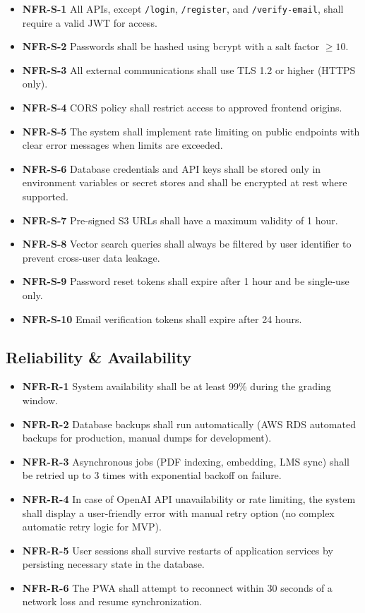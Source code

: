 \documentclass[12pt,a4paper]{article}
\begin{document}
\begin{itemize}
    \item \textbf{NFR-S-1} All APIs, except \texttt{/login}, \texttt{/register}, and \texttt{/verify-email}, shall require a valid JWT for access.
    \item \textbf{NFR-S-2} Passwords shall be hashed using bcrypt with a salt factor $\geq 10$.
    \item \textbf{NFR-S-3} All external communications shall use TLS 1.2 or higher (HTTPS only).
    \item \textbf{NFR-S-4} CORS policy shall restrict access to approved frontend origins.
    \item \textbf{NFR-S-5} The system shall implement rate limiting on public endpoints with clear error messages when limits are exceeded.
    \item \textbf{NFR-S-6} Database credentials and API keys shall be stored only in environment variables or secret stores and shall be encrypted at rest where supported.
    \item \textbf{NFR-S-7} Pre-signed S3 URLs shall have a maximum validity of 1 hour.
    \item \textbf{NFR-S-8} Vector search queries shall always be filtered by user identifier to prevent cross-user data leakage.
    \item \textbf{NFR-S-9} Password reset tokens shall expire after 1 hour and be single-use only.
    \item \textbf{NFR-S-10} Email verification tokens shall expire after 24 hours.
\end{itemize}

\subsection{Reliability \& Availability}

\begin{itemize}
    \item \textbf{NFR-R-1} System availability shall be at least 99\% during the grading window.
    \item \textbf{NFR-R-2} Database backups shall run automatically (AWS RDS automated backups for production, manual dumps for development).
    \item \textbf{NFR-R-3} Asynchronous jobs (PDF indexing, embedding, LMS sync) shall be retried up to 3 times with exponential backoff on failure.
    \item \textbf{NFR-R-4} In case of OpenAI API unavailability or rate limiting, the system shall display a user-friendly error with manual retry option (no complex automatic retry logic for MVP).
    \item \textbf{NFR-R-5} User sessions shall survive restarts of application services by persisting necessary state in the database.
    \item \textbf{NFR-R-6} The PWA shall attempt to reconnect within 30 seconds of a network loss and resume synchronization.
\end{itemize}
\end{document}
